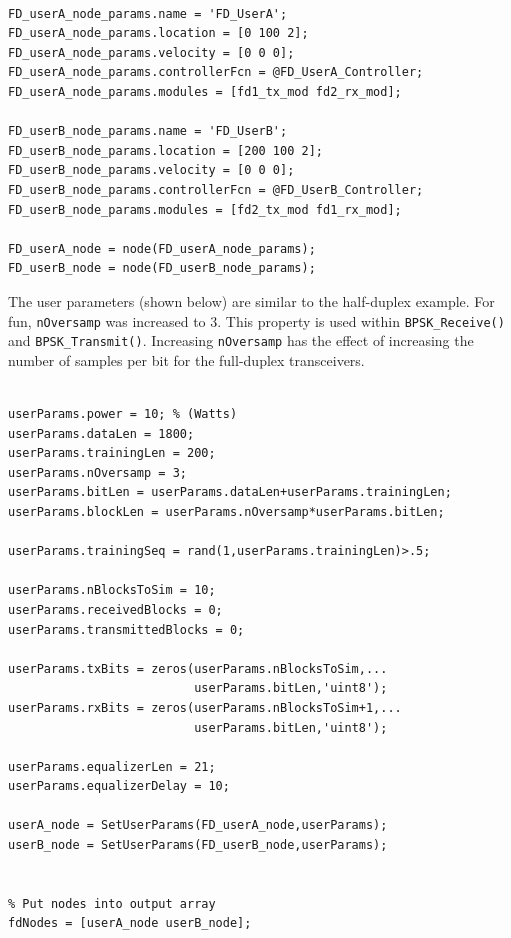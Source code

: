 \begin{lstlisting}[name=fdBuildNodes, firstnumber=93]
% Define nodes

FD_userA_node_params.name = 'FD_UserA';
FD_userA_node_params.location = [0 100 2];
FD_userA_node_params.velocity = [0 0 0];
FD_userA_node_params.controllerFcn = @FD_UserA_Controller;
FD_userA_node_params.modules = [fd1_tx_mod fd2_rx_mod];

FD_userB_node_params.name = 'FD_UserB';
FD_userB_node_params.location = [200 100 2];
FD_userB_node_params.velocity = [0 0 0];
FD_userB_node_params.controllerFcn = @FD_UserB_Controller;
FD_userB_node_params.modules = [fd2_tx_mod fd1_rx_mod];

FD_userA_node = node(FD_userA_node_params);
FD_userB_node = node(FD_userB_node_params);
\end{lstlisting}

The user parameters (shown below) are similar to the half-duplex
example.  For fun, \verb+nOversamp+ was increased to 3.  This
property is used within \verb+BPSK_Receive()+ and
\verb+BPSK_Transmit()+. Increasing \verb+nOversamp+ has the effect
of increasing the number of samples per bit for the full-duplex
transceivers.

\begin{lstlisting}[name=fdBuildNodes, firstnumber=111]
% Set user parameters

userParams.power = 10; % (Watts)
userParams.dataLen = 1800;
userParams.trainingLen = 200;
userParams.nOversamp = 3;
userParams.bitLen = userParams.dataLen+userParams.trainingLen;
userParams.blockLen = userParams.nOversamp*userParams.bitLen;

userParams.trainingSeq = rand(1,userParams.trainingLen)>.5;

userParams.nBlocksToSim = 10;
userParams.receivedBlocks = 0;
userParams.transmittedBlocks = 0;

userParams.txBits = zeros(userParams.nBlocksToSim,...
                          userParams.bitLen,'uint8');
userParams.rxBits = zeros(userParams.nBlocksToSim+1,...
                          userParams.bitLen,'uint8');

userParams.equalizerLen = 21;
userParams.equalizerDelay = 10;

userA_node = SetUserParams(FD_userA_node,userParams);
userB_node = SetUserParams(FD_userB_node,userParams);


% Put nodes into output array
fdNodes = [userA_node userB_node];
\end{lstlisting}

